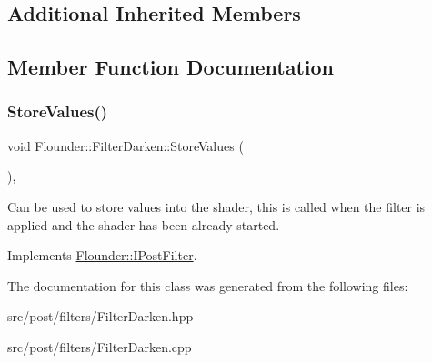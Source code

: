 \subsection*{Additional Inherited Members}


\subsection{Member Function Documentation}
\mbox{\label{class_flounder_1_1_filter_darken_a6c9ef0c04873788ddbd4b4a458598377}} 
\subsubsection{\texorpdfstring{Store\+Values()}{StoreValues()}}
{\footnotesize\ttfamily void Flounder\+::\+Filter\+Darken\+::\+Store\+Values (\begin{DoxyParamCaption}{ }\end{DoxyParamCaption})\hspace{0.3cm}{\ttfamily [override]}, {\ttfamily [virtual]}}



Can be used to store values into the shader, this is called when the filter is applied and the shader has been already started. 



Implements \hyperlink{class_flounder_1_1_i_post_filter_a20420ec0a9bac67437740552bea9ab74}{Flounder\+::\+I\+Post\+Filter}.



The documentation for this class was generated from the following files\+:\begin{DoxyCompactItemize}
\item 
src/post/filters/Filter\+Darken.\+hpp\item 
src/post/filters/Filter\+Darken.\+cpp\end{DoxyCompactItemize}
